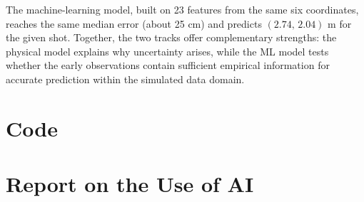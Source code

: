 \documentclass[11pt,a4paper]{article}
\begin{document}
The machine-learning model, built on 23 features from the same six coordinates, reaches the same median error (about 25 cm) and predicts $(2.74,\,2.04)$ m for the given shot. Together, the two tracks offer complementary strengths: the physical model explains why uncertainty arises, while the ML model tests whether the early observations contain sufficient empirical information for accurate prediction within the simulated data domain.



\appendix
\section{Code}


\section{Report on the Use of AI}

\end{document}
